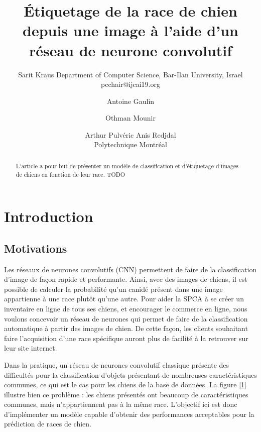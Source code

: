 \documentclass{article}
\title{Étiquetage de la race de chien depuis une image à l'aide d'un réseau de neurone convolutif}
\author{
    Sarit Kraus
    \affiliations
    Department of Computer Science, Bar-Ilan University, Israel \emails
    pcchair@ijcai19.org
}
\author{
Antoine Gaulin\and
Othman Mounir\and
Arthur Pulvéric\And
Anis Redjdal\\
\affiliations
Polytechnique Montréal\\
}
\begin{document}
\maketitle

\begin{abstract}
L'article a pour but de présenter un modèle de classification et d'étiquetage
d'images de chiens en fonction de leur race. TODO
\end{abstract}

\section{Introduction}

\subsection{Motivations}
Les réseaux de neurones convolutifs (CNN) permettent de faire de la
classification d'image de façon rapide et performante. Ainsi, avec des images de
chiens, il est possible de calculer la probabilité qu'un canidé présent dans une
image appartienne à une race plutôt qu’une autre. Pour aider la SPCA à se créer
un inventaire en ligne de tous ses chiens, et encourager le commerce en ligne,
nous voulons concevoir un réseau de neurones qui permet de faire de la
classification automatique à partir des images de chien. De cette façon, les
clients souhaitant faire l'acquisition d'une race spécifique auront plus de
facilité à la retrouver sur leur site internet.

Dans la pratique, un réseau de neurones convolutif classique présente des
difficultés pour la classification d’objets présentant de nombreuses
caractéristiques communes, ce qui est le cas pour les chiens de la base de 
données. La figure \ref{1} illustre bien ce problème : les chiens présentés ont
beaucoup de caractéristiques communes, mais n’appartiennent pas à la même race.
L’objectif ici est donc d’implémenter un modèle capable d’obtenir des
performances acceptables pour la prédiction de races de chien.
\end{document}
